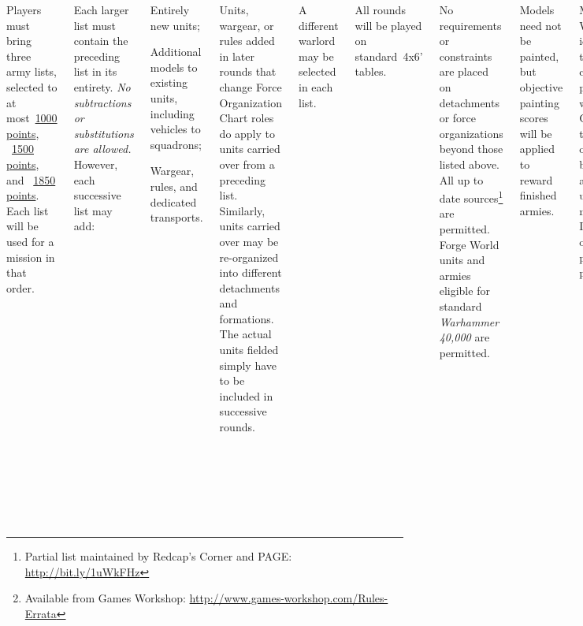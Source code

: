 \documentclass{40k}
\begin{document}

\begin{columns}


Players must bring three army lists, selected to at
most~\underline{1000 points}, ~\underline{1500 points}, and
~\underline{1850 points}.  Each list will be used for a mission in
that order.

Each larger list must contain the preceding list in its entirety.
\emph{No subtractions or substitutions are allowed.}  However, each
successive list may add:
\begin{squishitemize}
\item Entirely new units;
\item Additional models to existing units, including vehicles to squadrons;
\item Wargear, rules, and dedicated transports.
\end{squishitemize}

Units, wargear, or rules added in later rounds that change Force
Organization Chart roles do apply to units carried over from a
preceding list.  Similarly, units carried over may be re-organized
into different detachments and formations.  The actual units fielded
simply have to be included in successive rounds.

A different warlord may be selected in each list.

All rounds will be played on standard~4x6' tables.



No requirements or constraints are placed on detachments or force
organizations beyond those listed above.  All up to date
sources\footnote{Partial list maintained by Redcap's Corner and PAGE:
  \url{http://bit.ly/1uWkFHz}} are permitted.  Forge World units and
armies eligible for standard \emph{Warhammer 40,000} are permitted.

Models need not be painted, but objective painting scores will be
applied to reward finished armies.

Models must be WYSIWYG, but identifiable and thoughtful conversions
and proxies are welcome.  Contact the tournament organizer(s)
beforehand about any uncertain models.  Indistinguishable or confusing
proxies are not permitted.


You must have an official, legal, complete physical or digital copy on
hand for all army, unit, and other sources you are using.  You should
bring printed copies of relevant pages of any electronic sources.
Don't forget errata and FAQs for your sources.\footnote{Available from
  Games Workshop:
  \url{http://www.games-workshop.com/Rules-Errata}}


\end{columns}
\end{document}
